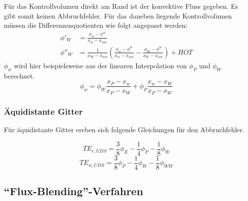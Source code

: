 Für das Kontrollvolumen direkt am Rand ist der konvektive Fluss gegeben. Es gibt somit keinen
Abbruchfehler. Für das daneben liegende Kontrollvolumen müssen die Differenzenquotienten wie folgt angepasst werden:
\begin{align*}
  \phi'_W &= \frac{\phi_w-\phi^w}{x_w-x_{ww}}\\
  \phi''_W &= \frac{1}{x_W-x_{ww}} \left({\frac{\phi_w-\phi^w}{x_w-x_{ww}}
- \frac{\phi_W-\phi^w}{x_W-x_{ww}} }\right)+HOT
\end{align*}
$\phi_w$ wird hier beispielsweise aus der linearen Interpolation von $\phi_P$ und $\phi_W$ berechnet.
\begin{equation*}
  \phi_w = \phi_W \frac{x_P-x_w}{x_P-x_W} + \phi_P \frac{x_w-x_W}{x_P-x_W}
\end{equation*}


\subsubsection{Äquidistante Gitter}

Für äquidistante Gitter ereben sich folgende Gleichungen für den Abbruchfehler.

\begin{equation*}
  TE_{e, UDS} = \frac{3}{8} \phi_E-\frac{1}{4} \phi_P - \frac{1}{8} \phi_W
\end{equation*}
\begin{equation*}
  TE_{w, UDS} = \frac{3}{8} \phi_P-\frac{1}{4} \phi_W - \frac{1}{8} \phi_{WW}
\end{equation*}





\subsection{``Flux-Blending''-Verfahren}

